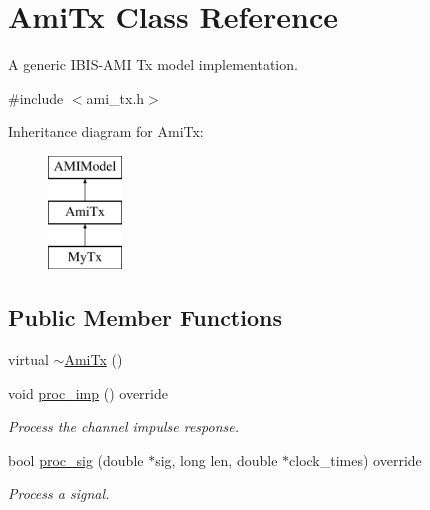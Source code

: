 \hypertarget{class_ami_tx}{}\section{Ami\+Tx Class Reference}
\label{class_ami_tx}


A generic I\+B\+I\+S-\/\+A\+M\+I Tx model implementation.  




{\ttfamily \#include $<$ami\+\_\+tx.\+h$>$}

Inheritance diagram for Ami\+Tx\+:\begin{figure}[H]
\begin{center}
\leavevmode
\includegraphics[height=3.000000cm]{class_ami_tx}
\end{center}
\end{figure}
\subsection*{Public Member Functions}
\begin{DoxyCompactItemize}
\item 
virtual \hyperlink{class_ami_tx_a0a30ee85116e1f2ba7c4a8876c0b7b8e}{$\sim$\+Ami\+Tx} ()
\item 
void \hyperlink{class_ami_tx_a94649674c8e8442c1d5434d509165594}{proc\+\_\+imp} () override
\begin{DoxyCompactList}\small\item\em Process the channel impulse response. \end{DoxyCompactList}\item 
bool \hyperlink{class_ami_tx_a8f326f6dfa875c00800491ff2104f248}{proc\+\_\+sig} (double $\ast$sig, long len, double $\ast$clock\+\_\+times) override
\begin{DoxyCompactList}\small\item\em Process a signal. \end{DoxyCompactList}\end{DoxyCompactItemize}
